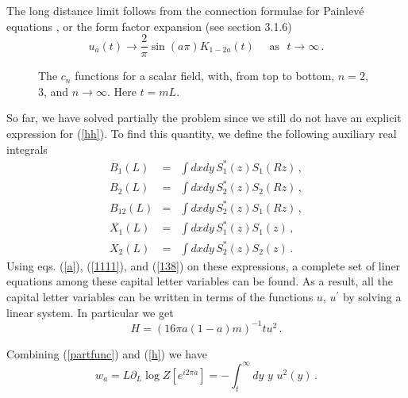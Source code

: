 \documentclass[11pt]{article}
\begin{document}
The long distance limit follows from the connection formulae for Painlev\'e equations \cite{rims}, or the form factor expansion (see section 3.1.6)
\begin{equation}
u_{a}(t)\rightarrow \frac{2}{\pi} \sin (a \pi) K_{1-2 a} (t)\,\,\,\,\,\,\,\, \textrm{as} \,\,\,\, t\rightarrow \infty \label{infinito}\,.
\end{equation}

\begin{figure} [tbp]
\centering
\leavevmode
\epsfxsize=8cm
\bigskip
{}
\caption{The $c_n$ functions for a scalar field, with, from top to bottom, $n=2$, $3$, and $n\rightarrow \infty$. Here $t=m L$.} \label{fii}
\end{figure}



So far, we have solved partially the problem since we still do not have an explicit expression for (\ref{hh}).
To find this quantity, we define the following auxiliary real integrals 
\begin{eqnarray}
B_{1}(L) &=&\int dxdy\,S_{1}^{*}(z)S_{1}(Rz)\,, \\
B_{2}(L) &=&\int dxdy\,S_{2}^{*}(z)S_{2}(Rz) \,,\\
B_{12}(L) &=&\int dxdy\,S_{2}^{*}(z)S_{1}(Rz) \,,\\
X_{1}(L) &=&\int dxdy\,S_{1}^{*}(z)S_{1}(z) \,,\label{x1}\\
X_{2}(L) &=&\int dxdy\,S_{2}^{*}(z)S_{2}(z)\,.\label{x2}
\end{eqnarray}
Using eqs. (\ref{a}), (\ref{1111}), and (\ref{138}) on these expressions, a complete set of liner equations among these capital letter variables can be found. 
 As a result, all the capital letter 
variables can be written in terms of the functions $u$, $u^\prime$ by solving a linear system. In particular we get
\begin{equation}
H=\left(16 \pi a \left( 1-a \right) m\right)^{-1} tu^{2}\,.\label{h}
\end{equation}

Combining (\ref{partfunc}) and (\ref{h}) we have 
\begin{equation}
w_a=L\partial_L\log Z[e^{i 2\pi a}] =-\int_{t}^{\infty}dy\,\,y\,\,u^{2}(y)\,. \label{kuu}
\end{equation}
\end{document}
